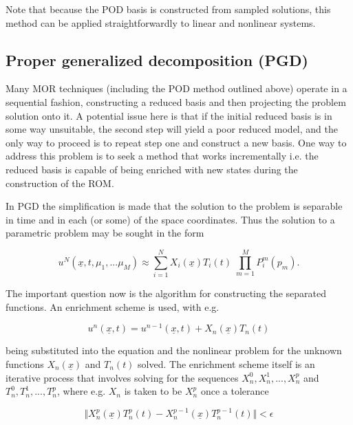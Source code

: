 Note that because the POD basis is constructed from sampled solutions, this method can be applied straightforwardly to linear and nonlinear systems.

\subsection{Proper generalized decomposition (PGD)}

Many MOR techniques (including the POD method outlined above) operate in a sequential fashion, constructing a reduced basis and then projecting the problem solution onto it.  
A potential issue here is that if the initial reduced basis is in some way unsuitable, the second step will yield a poor reduced model, and the only way to proceed is to repeat step one and construct a new basis.  
One way to address this problem is to seek a method that works incrementally i.e. the reduced basis is capable of being enriched with new states during the construction of the ROM.

In PGD the simplification is made that the solution to the problem is separable in time and in each (or some) of the space coordinates. %
Thus the solution to a parametric problem may be sought in the form

\begin{equation}
u^N(\underline{x}, t, \mu_1, ... \mu_M) \approx \sum_{i=1}^N X_i(\underline{x}) T_i(t) \; \prod_{m=1}^M P_i^m(p_m).
\end{equation}

The important question now is the algorithm for constructing the separated functions.  An enrichment scheme is used, with e.g.

\begin{equation}
u^n(\underline{x},t) = u^{n-1}(\underline{x},t) + X_n(\underline{x}) T_n(t)
\end{equation}

being substituted into the equation and the nonlinear problem for the unknown functions $X_n(\underline{x})$ and $T_n(t)$ solved.  
The enrichment scheme itself is an iterative process that involves solving for the sequences $X_n^0, X_n^1, ... , X_n^p$ and $T_n^0, T_n^1, ... , T_n^p$, where e.g. $X_n$ is taken to be $X_n^p$ once a tolerance 

\begin{equation}
\Vert X_n^p(\underline{x}) T_n^p(t) - X_n^{p-1}(\underline{x}) T_n^{p-1}(t) \Vert < \epsilon
\end{equation}

